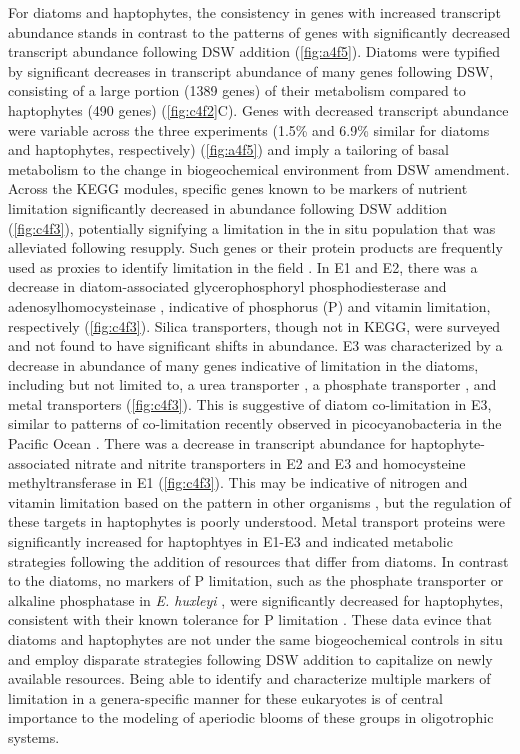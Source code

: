 For diatoms and haptophytes, the consistency in genes with increased transcript abundance stands in contrast to the patterns of genes with significantly decreased transcript abundance following DSW addition (\cref{fig:a4f5}). Diatoms were typified by significant decreases in transcript abundance of many genes following DSW, consisting of a large portion (1389 genes) of their metabolism compared to haptophytes (490 genes) (\cref{fig:c4f2}C). Genes with decreased transcript abundance were variable across the three experiments (1.5\% and 6.9\% similar for diatoms and haptophytes, respectively) (\cref{fig:a4f5}) and imply a tailoring of basal metabolism to the change in biogeochemical environment from DSW amendment. Across the KEGG modules, specific genes known to be markers of nutrient limitation significantly decreased in abundance following DSW addition (\cref{fig:c4f3}), potentially signifying a limitation in the in situ population that was alleviated following resupply. Such genes or their protein products are frequently used as proxies to identify limitation in the field \citep{Saito2014}. In E1 and E2, there was a decrease in diatom-associated glycerophosphoryl phosphodiesterase \citep{Dyhrman2012} and adenosylhomocysteinase \citep{Bertrand2012a}, indicative of phosphorus (P) and vitamin limitation, respectively (\cref{fig:c4f3}). Silica transporters, though not in KEGG, were surveyed and not found to have significant shifts in abundance. E3 was characterized by a decrease in abundance of many genes indicative of limitation in the diatoms, including but not limited to, a urea transporter \citep{Bender2012}, a phosphate transporter \citep{Dyhrman2012}, and metal transporters (\cref{fig:c4f3}). This is suggestive of diatom co-limitation in E3, similar to patterns of co-limitation recently observed in picocyanobacteria in the Pacific Ocean \citep{Saito2014}. There was a decrease in transcript abundance for haptophyte-associated nitrate and nitrite transporters in E2 and E3 and homocysteine methyltransferase in E1 (\cref{fig:c4f3}). This may be indicative of nitrogen and vitamin limitation based on the pattern in other organisms \citep{Bertrand2012a, Bender2014}, but the regulation of these targets in haptophytes is poorly understood. Metal transport proteins were significantly increased for haptophtyes in E1-E3 and indicated metabolic strategies following the addition of resources that differ from diatoms. In contrast to the diatoms, no markers of P limitation, such as the phosphate transporter or alkaline phosphatase in \textit{E. huxleyi} \citep{Dyhrman2006, Dyhrman2003, Xu2006}, were significantly decreased for haptophytes, consistent with their known tolerance for P limitation \citep{Lessard2005}. These data evince that diatoms and haptophytes are not under the same biogeochemical controls in situ and employ disparate strategies following DSW addition to capitalize on newly available resources. Being able to identify and characterize multiple markers of limitation in a genera-specific manner for these eukaryotes is of central importance to the modeling of aperiodic blooms of these groups in oligotrophic systems. \par 



